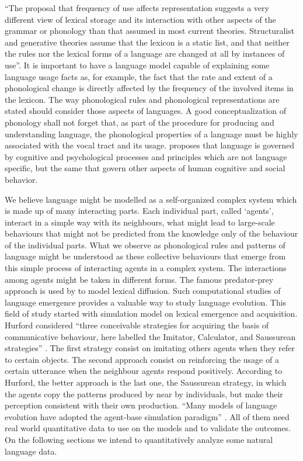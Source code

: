 ``The proposal that frequency of use affects representation suggests a very different view of lexical storage 
and its interaction with other aspects of the grammar or phonology than that assumed in most current theories. 
Structuralist and generative theories assume that the lexicon is a static list, and that neither the rules nor 
the lexical forms of a language are changed at all by instances of use''\citep{bybee2003}. 
It is important to have a language model capable of explaining some language usage facts as, for example, 
the fact that the rate and extent of a phonological change is directly affected by the frequency of the 
involved items in the lexicon. The way phonological rules and phonological representations are stated should 
consider those aspects of languages. A good conceptualization of phonology shall not forget that, 
as part of the procedure for producing and understanding language, the phonological properties of a language 
must be highly associated with the vocal tract and its usage. \cite{bybee2003} proposes that language is governed 
by cognitive and psychological processes and principles which are not language specific, but the same that govern 
other aspects of human cognitive and social behavior.

We believe language might be modelled as a self-organized complex system which is made up of many interacting parts.
Each individual part, called `agents', interact in a simple way with its neighbours, what might lead to large-scale
behaviours that might not be predicted from the knowledge only of the behaviour of the individual parts.  
What we observe as phonological rules and patterns of language might be understood as these collective behaviours 
that emerge from this simple process of interacting agents in a complex system. The interactions among agents might
be taken in different forms. The famous predator-prey approach is used by \cite{wang2004} to model lexical diffusion.
Such computational studies of language emergence provides a valuable way to study language evolution. This field of
study started with \cite{hurford89} simulation model on lexical emergence and acquisition. Hurford considered 
``three conceivable strategies for acquiring the basis of communicative behaviour, here labelled the Imitator, 
Calculator, and Saussurean strategies'' \citep{hurford89}. The first strategy consist on imitating others agents
when they refer to certain objects. The second approach consist on reinforcing the usage of a certain utterance 
when the neighbour agents respond positively. According to Hurford, the better approach is the last one, the
Saussurean strategy, in which the agents copy the patterns produced by near by individuals, but make their perception
consistent with their own production. ``Many models of language evolution have adopted the agent-base simulation
paradigm'' \citep{wang2004}. All of them need real world quantitative data to use on the models and to validate
the outcomes. On the following sections we intend to quantitatively analyze some natural language data.


